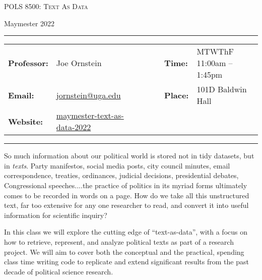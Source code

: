 \documentclass[11pt, letterpaper]{article}
\begin{document}
\begin{center}
{\Large \textsc{POLS 8500: Text As Data}}
\end{center}
\begin{center}
{\large Maymester 2022}
\end{center}

\begin{center}
\rule{6.5in}{0.4pt}
\begin{minipage}[t]{.96\textwidth}
\begin{tabular}{llcccll}
\textbf{Professor:} & Joe Ornstein & & &  & \textbf{Time:} & MTWThF 11:00am -- 1:45pm \\
\textbf{Email:} &  \href{mailto:jornstein@uga.edu}{jornstein@uga.edu} & & & & \textbf{Place:} & 101D Baldwin Hall\\
\textbf{Website:} & \href{https://github.com/joeornstein/maymester-text-as-data-2022}{maymester-text-as-data-2022} & & & & &
\end{tabular}
\end{minipage}
\rule{6.5in}{0.4pt}
\end{center}
\vspace{.15cm}
\setlength{\unitlength}{1in}
\renewcommand{\arraystretch}{2}


\noindent So much information about our political world is stored not in tidy datasets, but in \textit{texts}. Party manifestos, social media posts, city council minutes, email correspondence, treaties, ordinances, judicial decisions, presidential debates, Congressional speeches....the practice of politics in its myriad forms ultimately comes to be recorded in words on a page. How do we take all this unstructured text, far too extensive for any one researcher to read, and convert it into useful information for scientific inquiry?

In this class we will explore the cutting edge of ``text-as-data'', with a focus on how to retrieve, represent, and analyze political texts as part of a research project. We will aim to cover both the conceptual and the practical, spending class time writing code to replicate and extend significant results from the past decade of political science research. 


\end{document}
